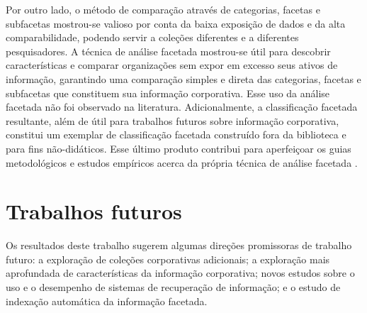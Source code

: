 Por outro lado, o método de comparação através de categorias, facetas e subfacetas mostrou-se valioso por conta da baixa exposição de dados e da alta comparabilidade, podendo servir a coleções diferentes e a diferentes pesquisadores. A técnica de análise facetada mostrou-se útil para descobrir características e comparar organizações sem expor em excesso seus ativos de informação, garantindo uma comparação simples e direta das categorias, facetas e subfacetas que constituem sua informação corporativa. Esse uso da análise facetada não foi observado na literatura. Adicionalmente, a classificação facetada resultante, além de útil para trabalhos futuros sobre informação corporativa, constitui um exemplar de classificação facetada construído fora da biblioteca e para fins não-didáticos. Esse último produto contribui para aperfeiçoar os guias metodológicos e estudos empíricos acerca da própria técnica de análise facetada \cite{wild2009describing,labarre2010}.















\section{Trabalhos futuros}
\label{conclusao-futuros}

Os resultados deste trabalho sugerem algumas direções promissoras de trabalho futuro: a exploração de coleções corporativas adicionais; a exploração mais aprofundada de características da informação corporativa; novos estudos sobre o uso e o desempenho de sistemas de recuperação de informação; e o estudo de indexação automática da informação facetada.

